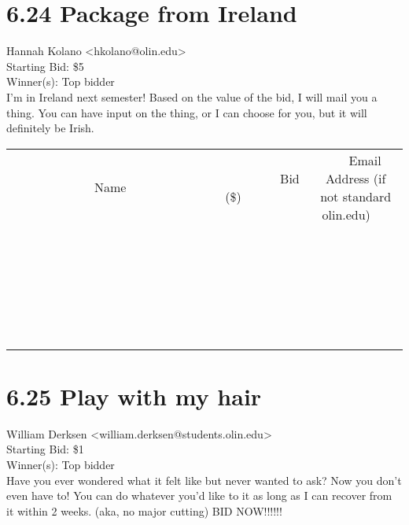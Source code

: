 \documentclass[11pt]{article}
\begin{document}
					\section*{6.24 Package from Ireland}
					Hannah Kolano <hkolano@olin.edu> \\
					Starting Bid: \$5 \\
					Winner(s): Top bidder \\
					I'm in Ireland next semester! Based on the value of the bid, I will mail you a thing. You can have input on the thing, or I can choose for you, but it will definitely be Irish. \\
					[6ex]
					\begin{tabular}{c c c}
						~~~~~~~~~~~~~Name~~~~~~~~~~~~~ & ~~~~~~~~~Bid (\$)~~~~~~~~~ & ~~~Email Address (if not standard olin.edu)~~~ \\
				
 & & \\
\hline
 & & \\
\hline
 & & \\
\hline
 & & \\
\hline
 & & \\
\hline
 & & \\
\hline
 & & \\
\hline
 & & \\
\hline
 & & \\
\hline
 & & \\
\hline
 & & \\
\hline
 & & \\
\hline
 & & \\
\hline
 & & \\
\hline
 & & \\
\hline
 & & \\
\hline
 & & \\
\hline
 & & \\
\hline
 & & \\
\hline
 & & \\
\hline
 & & \\
\hline
 & & \\
\hline
 & & \\
\hline
 & & \\
\hline
 & & \\
\hline
 & & \\
\hline
					\end{tabular}
					\clearpage
				
					\section*{6.25 Play with my hair}
					William Derksen <william.derksen@students.olin.edu> \\
					Starting Bid: \$1 \\
					Winner(s): Top bidder \\
					Have you ever wondered what it felt like but never wanted to ask? Now you don't even have to!  You can do whatever you'd like to it as long as I can recover from it within 2 weeks.  (aka, no major cutting)  BID NOW!!!!!!
\end{document}

